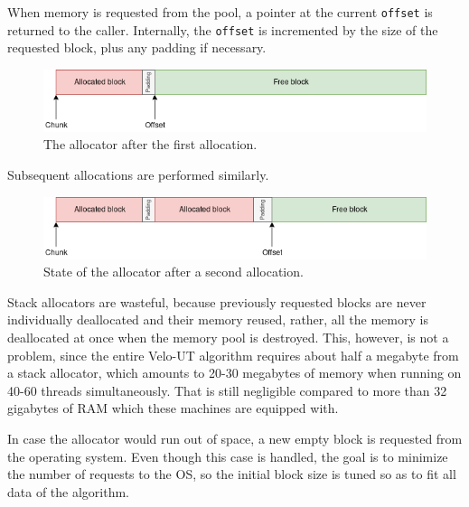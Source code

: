 \documentclass[12pt]{article}
\newcommand{\code}[1]{\texttt{#1}}
\begin{document}
When memory is requested from the pool, a pointer at the current \code{offset} is returned to the caller. Internally, the \code{offset} is incremented by the size of the requested block, plus any padding if necessary.

\begin{figure}[H]
	\begin{center}
		\includegraphics[width=\textwidth]{velout_stack_allocator_alloc1}
	\end{center}
	\caption{The allocator after the first allocation.}
	\label{fig_velout_stack_allocator_alloc1}
\end{figure}

Subsequent allocations are performed similarly.

\begin{figure}[H]
	\begin{center}
		\includegraphics[width=\textwidth]{velout_stack_allocator_alloc2}
	\end{center}
	\caption{State of the allocator after a second allocation.}
	\label{fig_velout_stack_allocator_alloc2}
\end{figure}

Stack allocators are wasteful, because previously requested blocks are never individually deallocated and their memory reused, rather, all the memory is deallocated at once when the memory pool is destroyed. This, however, is not a problem, since the entire Velo-UT algorithm requires about half a megabyte from a stack allocator, which amounts to 20-30 megabytes of memory when running on 40-60 threads simultaneously. That is still negligible compared to more than 32 gigabytes of RAM which these machines are equipped with.

In case the allocator would run out of space, a new empty block is requested from the operating system. Even though this case is handled, the goal is to minimize the number of requests to the OS, so the initial block size is tuned so as to fit all data of the algorithm.
\end{document}
